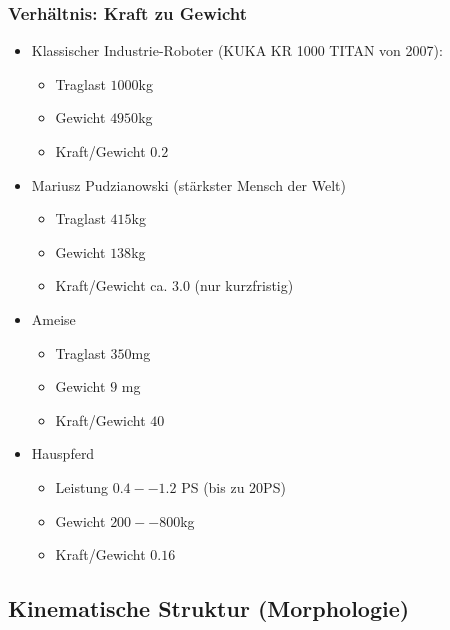 \subsubsection{Verhältnis: Kraft zu Gewicht}
\begin{itemize}
	\item Klassischer Industrie-Roboter (KUKA KR 1000 TITAN von 2007):
	\begin{itemize}
		\item Traglast $1000$kg
		\item Gewicht $4950$kg
		\item Kraft/Gewicht $0.2$
	\end{itemize}
	\item Mariusz Pudzianowski (stärkster Mensch der Welt)
	\begin{itemize}
		\item Traglast $415$kg
		\item Gewicht $138$kg
		\item Kraft/Gewicht ca. $3.0$ (nur kurzfristig)
	\end{itemize}
	\item Ameise
	\begin{itemize}
		\item Traglast $350$mg
		\item Gewicht $9$ mg
		\item Kraft/Gewicht $40$
	\end{itemize}
	\item Hauspferd
	\begin{itemize}
		\item Leistung $0.4 -- 1.2$ PS (bis zu $20$PS)
		\item Gewicht $200--800$kg
		\item Kraft/Gewicht $0.16$
	\end{itemize}
\end{itemize}

\subsection{Kinematische Struktur (Morphologie)}

